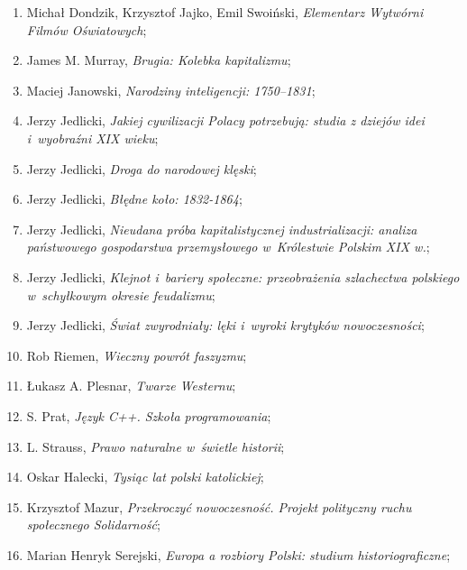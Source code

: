 \documentclass[a4paper,11pt]{article}
\begin{document}
\begin{enumerate}
\item Michał Dondzik, Krzysztof Jajko, Emil Swoiński, \emph{Elementarz
    Wytwórni Filmów Oświatowych};

\item James M. Murray, \emph{Brugia: Kolebka kapitalizmu};

\item Maciej Janowski, \emph{Narodziny inteligencji: 1750--1831};

\item Jerzy Jedlicki, \emph{Jakiej cywilizacji Polacy potrzebują:
    studia z dziejów idei i~wyobraźni XIX wieku};

\item Jerzy Jedlicki, \emph{Droga do narodowej klęski};

\item Jerzy Jedlicki, \emph{Błędne koło: 1832-1864};

\item Jerzy Jedlicki, \emph{Nieudana próba kapitalistycznej
    industrializacji: analiza państwowego gospodarstwa przemysłowego
    w~Królestwie Polskim XIX w.};

\item Jerzy Jedlicki, \emph{Klejnot i~bariery społeczne: przeobrażenia
    szlachectwa polskiego w~schyłkowym okresie feudalizmu};

\item Jerzy Jedlicki, \emph{Świat zwyrodniały: lęki i~wyroki krytyków
    nowoczesności};

\item Rob Riemen, \emph{Wieczny powrót faszyzmu};

\item Łukasz A. Plesnar, \emph{Twarze Westernu};

\item S. Prat, \emph{Język C++. Szkoła programowania};

\item L. Strauss, \emph{Prawo naturalne w~świetle historii};

\item Oskar Halecki, \emph{Tysiąc lat polski katolickiej};

\item Krzysztof Mazur, \emph{Przekroczyć nowoczesność. Projekt
    polityczny ruchu społecznego Solidarność};

\item Marian Henryk Serejski, \emph{Europa a rozbiory Polski: studium
    historiograficzne};


\end{enumerate}
\end{document}
